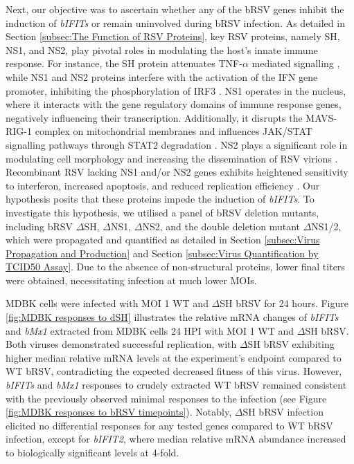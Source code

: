 Next, our objective was to ascertain whether any of the bRSV genes inhibit the induction of \textit{bIFITs} or remain uninvolved during bRSV infection. As detailed in Section \ref{subsec:The Function of RSV Proteins}, key RSV proteins, namely SH, NS1, and NS2, play pivotal roles in modulating the host's innate immune response. For instance, the SH protein attenuates TNF-\(\alpha\) mediated signalling \cite{Fuentes2007FunctionProtein}, while NS1 and NS2 proteins interfere with the activation of the IFN gene promoter, inhibiting the phosphorylation of IRF3 \cite{Spann2005EffectsCytokines, Wright2006TheHumans}. NS1 operates in the nucleus, where it interacts with the gene regulatory domains of immune response genes, negatively influencing their transcription. Additionally, it disrupts the MAVS-RIG-1 complex on mitochondrial membranes and influences JAK/STAT signalling pathways through STAT2 degradation \cite{Pei2021Nuclear-localizedTranscription, Boyapalle2012RespiratoryInfection, Wright2006TheHumans}. NS2 plays a significant role in modulating cell morphology and increasing the dissemination of RSV virions \cite{Sedeyn2019RespiratoryResponses, Liesman2014RSV-encodedObstruction}. Recombinant RSV lacking NS1 and/or NS2 genes exhibits heightened sensitivity to interferon, increased apoptosis, and reduced replication efficiency \cite{Whitehead1999RecombinantChimpanzees, Teng2000RecombinantChimpanzees}. Our hypothesis posits that these proteins impede the induction of \textit{bIFITs}. To investigate this hypothesis, we utilised a panel of bRSV deletion mutants, including bRSV \(\Delta\)SH, \(\Delta\)NS1, \(\Delta\)NS2, and the double deletion mutant \(\Delta\)NS1/2, which were propagated and quantified as detailed in Section \ref{subsec:Virus Propagation and Production} and Section \ref{subsec:Virus Quantification by TCID50 Assay}. Due to the absence of non-structural proteins, lower final titers were obtained, necessitating infection at much lower MOIs. 

MDBK cells were infected with MOI 1 WT and \(\Delta\)SH bRSV for 24 hours. Figure \ref{fig:MDBK responses to dSH} illustrates the relative mRNA changes of \textit{bIFITs} and \textit{bMx1} extracted from MDBK cells 24 HPI with MOI 1 WT and \(\Delta\)SH bRSV. Both viruses demonstrated successful replication, with \(\Delta\)SH bRSV exhibiting higher median relative mRNA levels at the experiment's endpoint compared to WT bRSV, contradicting the expected decreased fitness of this virus. However, \textit{bIFITs} and \textit{bMx1} responses to crudely extracted WT bRSV remained consistent with the previously observed minimal responses to the infection (see Figure \ref{fig:MDBK responses to bRSV timepoints}). Notably, \(\Delta\)SH bRSV infection elicited no differential responses for any tested genes compared to WT bRSV infection, except for \textit{bIFIT2}, where median relative mRNA abundance increased to biologically significant levels at 4-fold.

